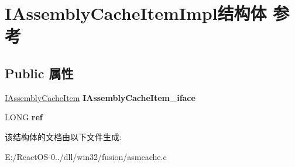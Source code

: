 \hypertarget{struct_i_assembly_cache_item_impl}{}\section{I\+Assembly\+Cache\+Item\+Impl结构体 参考}
\label{struct_i_assembly_cache_item_impl}
\subsection*{Public 属性}
\begin{DoxyCompactItemize}
\item 
\mbox{\label{struct_i_assembly_cache_item_impl_ad4cc3313fa56c852594fe2f030a3bc8b}} 
\hyperlink{interface_i_assembly_cache_item}{I\+Assembly\+Cache\+Item} {\bfseries I\+Assembly\+Cache\+Item\+\_\+iface}
\item 
\mbox{\label{struct_i_assembly_cache_item_impl_a39d6569bfe4d668d9afa1f6203d8cd82}} 
L\+O\+NG {\bfseries ref}
\end{DoxyCompactItemize}


该结构体的文档由以下文件生成\+:\begin{DoxyCompactItemize}
\item 
E\+:/\+React\+O\+S-\/0../dll/win32/fusion/asmcache.\+c\end{DoxyCompactItemize}

